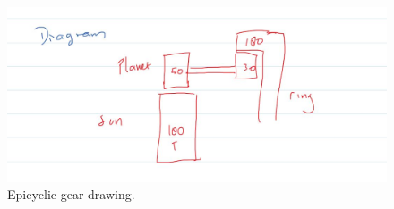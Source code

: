 \begin{figure}[H]
\centering
\includegraphics[width=1\textwidth]{chapters/lab3/geardrawing}
\caption{Epicyclic gear drawing.}
\label{fig:mesh1}
\end{figure}